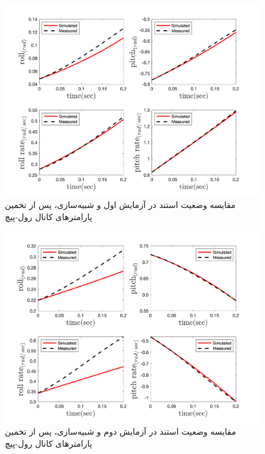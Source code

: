 \begin{figure}[H]
	\includegraphics[width=12cm]{../Figures/RCP/roll_pitch_parameter_estimation/RCP_roll_pitch_S1.png}
	\centering
	\caption{مقايسه وضعیت استند در  آزمايش اول و شبیه‌سازی، پس از تخمین پارامترهای کانال رول-پیچ}
	\label{roll_pitch_ps1}
\end{figure}
\begin{figure}[H]
	\includegraphics[width=12cm]{../Figures/RCP/roll_pitch_parameter_estimation/RCP_roll_pitch_S2.png}
	\centering
	\caption{مقايسه وضعیت استند در  آزمايش دوم و شبیه‌سازی، پس از تخمین پارامترهای کانال رول-پیچ}
	\label{roll_pitch_ps2}
\end{figure}
